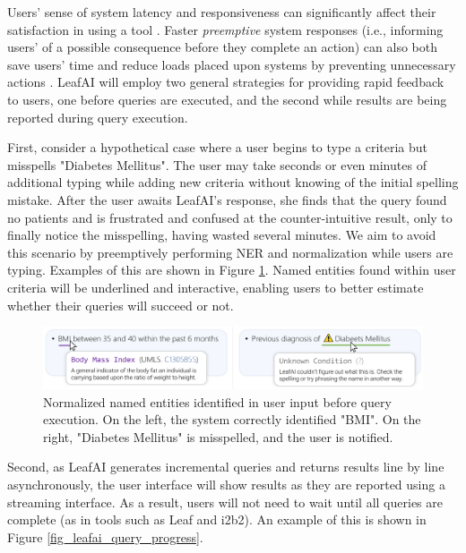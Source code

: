 \documentclass[../main.tex]{subfiles}
\begin{document}
Users' sense of system latency and responsiveness can significantly affect their satisfaction in using a tool \cite{li2019effects, arapakis2014impact, shneiderman1984response}. Faster \textit{preemptive} system responses (i.e., informing users' of a possible consequence before they complete an action) can also both save users' time and reduce loads placed upon systems by preventing unnecessary actions \cite{lempel2003predictive, diaz2016search}. LeafAI will employ two general strategies for providing rapid feedback to users, one before queries are executed, and the second while results are being reported during query execution.

First, consider a hypothetical case where a user begins to type a criteria but misspells "Diabetes Mellitus". The user may take seconds or even minutes of additional typing while adding new criteria without knowing of the initial spelling mistake. After the user awaits LeafAI's response, she finds that the query found no patients and is frustrated and confused at the counter-intuitive result, only to finally notice the misspelling, having wasted several minutes. We aim to avoid this scenario by preemptively performing NER and normalization while users are typing. Examples of this are shown in Figure \ref{fig_leafai_mouse_hover}. Named entities found within user criteria will be underlined and interactive, enabling users to better estimate whether their queries will succeed or not.

\begin{figure}[h!]
  \centering
  \includegraphics[scale=0.68]{Figures/8_web_application/leafai_mouse_hover.pdf}  
  \caption{Normalized named entities identified in user input before query execution. On the left, the system correctly identified "BMI". On the right, "Diabetes Mellitus" is misspelled, and the user is notified.}
\label{fig_leafai_mouse_hover}
\end{figure}

Second, as LeafAI generates incremental queries and returns results line by line asynchronously, the user interface will show results as they are reported using a streaming interface. As a result, users will not need to wait until all queries are complete (as in tools such as Leaf and i2b2). An example of this is shown in Figure \ref{fig_leafai_query_progress}.
\end{document}

